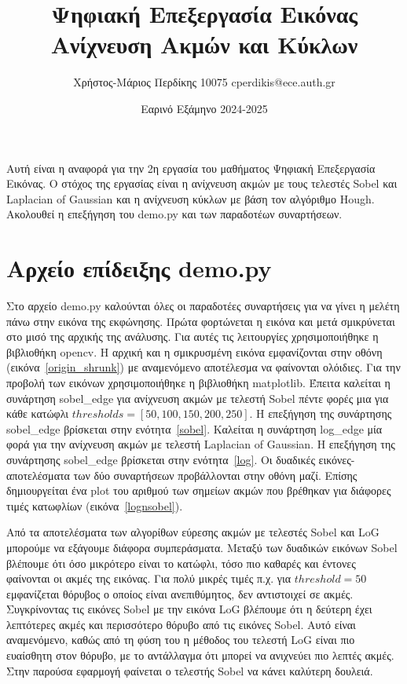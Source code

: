 \documentclass{article}
\title{Ψηφιακή Επεξεργασία Εικόνας \\ Ανίχνευση Ακμών και Κύκλων}
\date{Εαρινό Εξάμηνο 2024-2025}
\author{Χρήστος-Μάριος Περδίκης 10075 cperdikis@ece.auth.gr}
\begin{document}
\maketitle

Αυτή είναι η αναφορά για την 2η εργασία του μαθήματος Ψηφιακή Επεξεργασία 
Εικόνας. Ο στόχος της εργασίας είναι η ανίχνευση ακμών με τους τελεστές Sobel
και Laplacian of Gaussian και η ανίχνευση κύκλων με βάση τον αλγόριθμο Hough.
Ακολουθεί η επεξήγηση του demo.py και των παραδοτέων συναρτή\-σεων.

\section{Αρχείο επίδειξης demo.py}
Στο αρχείο demo.py καλούνται όλες οι παραδοτέες συναρτήσεις για να γίνει η 
μελέτη πάνω στην εικόνα της εκφώνησης. Πρώτα φορτώνεται η εικόνα και μετά 
σμικρύνεται στο μισό της αρχικής της ανάλυσης. Για αυτές τις λειτουργίες 
χρησιμοποιήθηκε η βιβλιοθήκη
opencv. Η αρχική και η σμικρυσμένη εικόνα εμφανίζονται στην οθόνη 
(εικόνα~\ref{origin_shrunk}) με αναμενόμενο 
αποτέλεσμα να φαίνονται ολόιδιες. Για την προβολή των εικόνων 
χρησιμοποιήθηκε η βιβλιοθήκη matplotlib. Έπειτα καλείται η συνάρτηση  sobel\_edge 
για ανίχνευση ακμών 
με τελεστή Sobel πέντε φορές μια για κάθε κατώφλι $thresholds = \left[50,100,150,
200,250\right]$. Η επεξήγηση της συνάρτησης sobel\_edge βρίσκεται στην 
ενότητα~\ref{sobel}. Καλείται η συνάρτηση log\_edge μία φορά για την ανίχνευση ακμών με
τελεστή Laplacian of Gaussian. Η επεξήγηση της συνάρτησης sobel\_edge βρίσκεται στην 
ενότητα~\ref{log}. Οι δυαδικές εικόνες-αποτελέσματα των δύο συναρτήσεων 
προβάλλονται στην οθόνη μαζί. Επίσης δημιουργείται
ένα plot του αριθμού των σημείων ακμών που βρέθηκαν για διάφορες τιμές κατωφλίων
(εικόνα~\ref{lognsobel}). 

Από τα αποτελέσματα των αλγορίθων εύρεσης ακμών με τελεστές Sobel και LoG 
μπορούμε να εξάγουμε διάφορα συμπεράσματα. 
Μεταξύ των δυαδικών εικόνων Sobel βλέπουμε ότι όσο μικρότερο είναι το κατώφλι,
τόσο πιο καθαρές και έντονες φαίνονται οι ακμές της εικόνας. Για πολύ μικρές τιμές 
π.χ. για $threshold = 50$ εμφανίζεται θόρυβος ο οποίος είναι ανεπιθύμητος, δεν 
αντιστοιχεί σε ακμές. Συγκρίνοντας τις εικόνες Sobel με την εικόνα LoG βλέπουμε
ότι η δεύτερη έχει λεπτότερες ακμές και περισσότερο θόρυβο από τις εικόνες 
Sobel. Αυτό είναι αναμενόμενο, καθώς από τη φύση του η μέθοδος του τελεστή LoG
είναι πιο ευαίσθητη στον θόρυβο, με το αντάλλαγμα ότι μπορεί να ανιχνεύει πιο 
λεπτές ακμές. Στην παρούσα εφαρμογή φαίνεται ο τελεστής Sobel να κάνει καλύτερη
δουλειά.
\end{document}
